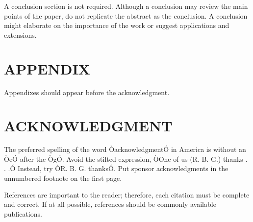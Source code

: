 \documentclass[letterpaper, 10 pt, conference]{ieeeconf}  %
\begin{document}
A conclusion section is not required. Although a conclusion may review the main points of the paper, do not replicate the abstract as the conclusion. A conclusion might elaborate on the importance of the work or suggest applications and extensions. 

\addtolength{\textheight}{-12cm}   %







\section*{APPENDIX}

Appendixes should appear before the acknowledgment.

\section*{ACKNOWLEDGMENT}

The preferred spelling of the word ÒacknowledgmentÓ in America is without an ÒeÓ after the ÒgÓ. Avoid the stilted expression, ÒOne of us (R. B. G.) thanks . . .Ó  Instead, try ÒR. B. G. thanksÓ. Put sponsor acknowledgments in the unnumbered footnote on the first page.




References are important to the reader; therefore, each citation must be complete and correct. If at all possible, references should be commonly available publications.
\end{document}
